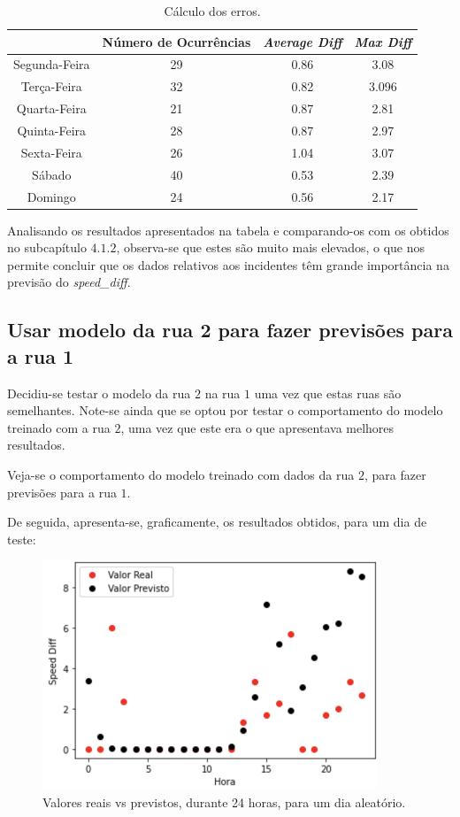 \documentclass[a4paper, 12pt]{article}
\begin{document}
\begin{table}[H]
	\centering
	\begin{tabular}{||c||c|c|c||}
		\hline\hline
		& Número de Ocurrências&\textit{Average Diff} & \textit{Max Diff} \\
		\hline\hline
		 Segunda-Feira & 29&
0.86
 & 3.08\\
		\hline
		 Terça-Feira  &32&
0.82& 3.096  \\
		\hline
		 Quarta-Feira &21& 0.87
 & 2.81 \\
		\hline
		 Quinta-Feira  & 28&
0.87
 & 2.97\\
		\hline
		 Sexta-Feira &26& 1.04 & 3.07 \\
		\hline
		 Sábado  &40& 0.53&2.39  \\
		\hline
		 Domingo &24& 0.56
 & 2.17
 \\
		\hline\hline
	\end{tabular}
	\label{table:no_inc}
	\caption{Cálculo dos erros.}
\end{table}

Analisando os resultados apresentados na tabela e comparando-os com os obtidos no subcapítulo $4.1.2$, observa-se que estes são muito mais elevados, o que nos permite concluir que os dados relativos aos incidentes têm grande importância na previsão do \textit{speed\_diff}.

\subsection{Usar modelo da rua 2 para fazer previsões para a rua 1}

Decidiu-se testar o modelo da rua $2$ na rua $1$ uma vez que estas ruas são semelhantes. Note-se ainda que se optou por testar o comportamento do modelo treinado com a rua $2$, uma vez que este era o que apresentava melhores resultados.

Veja-se o comportamento do modelo treinado com dados da rua $2$, para fazer previsões para a rua $1$.

De seguida, apresenta-se, graficamente, os resultados obtidos, para um dia de teste:

\begin{figure}[H]
	\centering
	\includegraphics[width=10cm]{resultados/real_prev_mod2_rua1.png}
	\caption{Valores reais vs previstos, durante 24 horas, para um dia aleatório.}
\end{figure}
\end{document}

